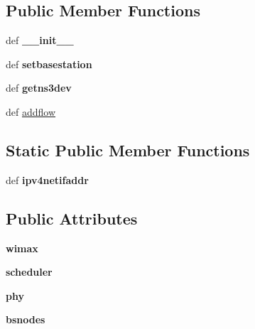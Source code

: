 \subsection*{Public Member Functions}
\begin{DoxyCompactItemize}
\item 
\hypertarget{classcorens3_1_1obj_1_1_ns3_wimax_net_aa77f28ad7a0e5e73e38ab258f49355fd}{def {\bfseries \+\_\+\+\_\+init\+\_\+\+\_\+}}\label{classcorens3_1_1obj_1_1_ns3_wimax_net_aa77f28ad7a0e5e73e38ab258f49355fd}

\item 
\hypertarget{classcorens3_1_1obj_1_1_ns3_wimax_net_a779de27834e75456ae4e61317c44bbd7}{def {\bfseries setbasestation}}\label{classcorens3_1_1obj_1_1_ns3_wimax_net_a779de27834e75456ae4e61317c44bbd7}

\item 
\hypertarget{classcorens3_1_1obj_1_1_ns3_wimax_net_ad02a6c80efdd24939556a314eb9c536f}{def {\bfseries getns3dev}}\label{classcorens3_1_1obj_1_1_ns3_wimax_net_ad02a6c80efdd24939556a314eb9c536f}

\item 
def \hyperlink{classcorens3_1_1obj_1_1_ns3_wimax_net_af4fa63a5b3e364dd4c7951f667f443b2}{addflow}
\end{DoxyCompactItemize}
\subsection*{Static Public Member Functions}
\begin{DoxyCompactItemize}
\item 
\hypertarget{classcorens3_1_1obj_1_1_ns3_wimax_net_a216d4cce76ee105e8ba70245919c4601}{def {\bfseries ipv4netifaddr}}\label{classcorens3_1_1obj_1_1_ns3_wimax_net_a216d4cce76ee105e8ba70245919c4601}

\end{DoxyCompactItemize}
\subsection*{Public Attributes}
\begin{DoxyCompactItemize}
\item 
\hypertarget{classcorens3_1_1obj_1_1_ns3_wimax_net_afcb7b39fae7ffbe51d565b0f12a721b8}{{\bfseries wimax}}\label{classcorens3_1_1obj_1_1_ns3_wimax_net_afcb7b39fae7ffbe51d565b0f12a721b8}

\item 
\hypertarget{classcorens3_1_1obj_1_1_ns3_wimax_net_af3b728f414223c497a1943f657aadf53}{{\bfseries scheduler}}\label{classcorens3_1_1obj_1_1_ns3_wimax_net_af3b728f414223c497a1943f657aadf53}

\item 
\hypertarget{classcorens3_1_1obj_1_1_ns3_wimax_net_a92d84206502bf8deff7080be4a33f260}{{\bfseries phy}}\label{classcorens3_1_1obj_1_1_ns3_wimax_net_a92d84206502bf8deff7080be4a33f260}

\item 
\hypertarget{classcorens3_1_1obj_1_1_ns3_wimax_net_a19223bb6cc3ff15e772fcdc5bf893e4f}{{\bfseries bsnodes}}\label{classcorens3_1_1obj_1_1_ns3_wimax_net_a19223bb6cc3ff15e772fcdc5bf893e4f}

\end{DoxyCompactItemize}
